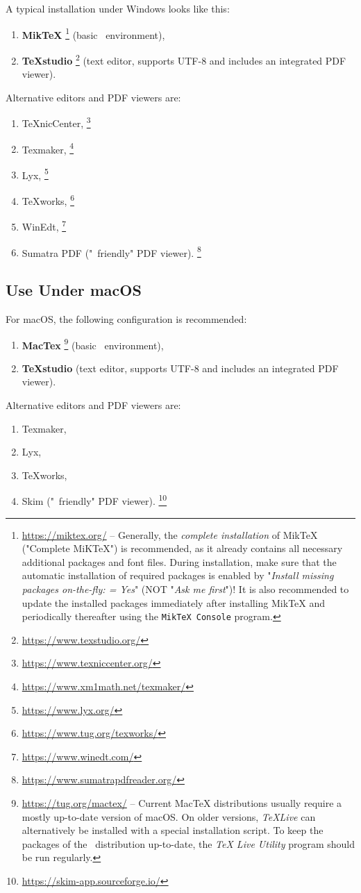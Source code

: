 A typical installation under Windows looks like this:
%
\begin{enumerate}
\item \textbf{MikTeX}%
	\footnote{\url{https://miktex.org/} -- 
  Generally, the \emph{complete installation} of MikTeX ("Complete MiKTeX") is 
	recommended, as it already contains all necessary additional packages and font files.
	During installation, make sure that the automatic installation of required packages
	is enabled by "\emph{Install missing packages on-the-fly: = Yes}" 
	(NOT "\emph{Ask me first}")!
	It is also recommended to update the installed packages immediately after installing MikTeX 
	and periodically thereafter using the \texttt{MikTeX Console} program.} 
	(basic \latex\ environment),
\item \textbf{TeXstudio}%
	\footnote{\url{https://www.texstudio.org/}}
	(text editor, supports UTF-8 and includes an integrated PDF viewer).
\end{enumerate}
%
Alternative editors and PDF viewers are:
%
\begin{enumerate}
	\item TeXnicCenter,%
	\footnote{\url{https://www.texniccenter.org/}}
	\item Texmaker,%
	\footnote{\url{https://www.xm1math.net/texmaker/}}
	\item Lyx,%
	\footnote{\url{https://www.lyx.org/}}
	\item TeXworks,%
	\footnote{\url{https://www.tug.org/texworks/}}
	\item WinEdt,%
	\footnote{\url{https://www.winedt.com/}}
	\item Sumatra PDF ("\latex\ friendly" PDF viewer).%
	\footnote{\url{https://www.sumatrapdfreader.org/}}
\end{enumerate}


\subsection{Use Under macOS}

For macOS, the following configuration is recommended:
%
\begin{enumerate}
\item 
	\textbf{MacTex}%
	\footnote{\url{https://tug.org/mactex/} -- 
	Current MacTeX distributions usually require a mostly up-to-date version of macOS. 
	On older versions, \emph{TeXLive} can alternatively be installed with a special
	installation script. To keep the packages of the \latex\ distribution up-to-date, the 
	\emph{TeX Live Utility} program should be run regularly.}
	(basic \latex\ environment),
\item \textbf{TeXstudio} (text editor, supports UTF-8 and includes an integrated PDF viewer).
\end{enumerate}
%
Alternative editors and PDF viewers are:
%
\begin{enumerate}
	\item Texmaker,%
	\item Lyx,%
	\item TeXworks,%
	\item Skim ("\latex\ friendly" PDF viewer).%
	\footnote{\url{https://skim-app.sourceforge.io/}}
\end{enumerate}


